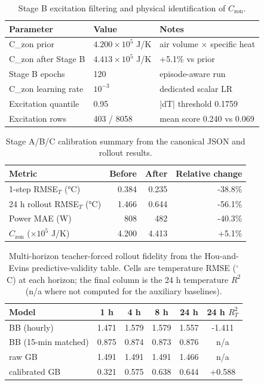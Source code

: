 \documentclass[11pt,a4paper]{article}
\newcommand{\Czon}{\ensuremath{C_{\mathrm{zon}}}}
\begin{document}
\begin{table}[H]
\centering
\small
\caption{Stage B excitation filtering and physical identification of \(\Czon\).}
\label{tab:stage-b}
\begin{tabularx}{\linewidth}{llX}
\toprule
Parameter & Value & Notes \\
\midrule
C\_zon prior & $4.200\times10^5$ J/K & air volume $\times$ specific heat \\
C\_zon after Stage B & $4.413\times10^5$ J/K & +5.1\% vs prior \\
Stage B epochs & 120 & episode-aware run \\
C\_zon learning rate & $10^{-3}$ & dedicated scalar LR \\
Excitation quantile & 0.95 & |dT| threshold 0.1759 \\
Excitation rows & 403 / 8058 & mean score 0.240 vs 0.069 \\
\bottomrule
\end{tabularx}
\end{table}
\begin{table}[H]
\centering
\small
\caption{Stage A/B/C calibration summary from the canonical JSON and rollout results.}
\label{tab:stage-abc}
\begin{tabular}{lrrr}
\toprule
Metric & Before & After & Relative change \\
\midrule
1-step RMSE$_T$ (\si{\celsius}) & 0.384 & 0.235 & -38.8\% \\
24 h rollout RMSE$_T$ (\si{\celsius}) & 1.466 & 0.644 & -56.1\% \\
Power MAE (\si{\watt}) & 808 & 482 & -40.3\% \\
$\Czon$ ($\times 10^5$ J/K) & 4.200 & 4.413 & +5.1\% \\
\bottomrule
\end{tabular}
\end{table}
\begin{table}[H]
\centering
\small
\caption{Multi-horizon teacher-forced rollout fidelity from the Hou-and-Evins predictive-validity table. Cells are temperature RMSE (\(^\circ\)C) at each horizon; the final column is the 24 h temperature \(R^2\) (n/a where not computed for the auxiliary baselines).}
\label{tab:multi-horizon}
\begin{tabular}{lccccc}
\toprule
Model & 1 h & 4 h & 8 h & 24 h & 24 h \(R^2_T\) \\
\midrule
BB (hourly) & 1.471 & 1.579 & 1.579 & 1.557 & -1.411 \\
BB (15-min matched) & 0.875 & 0.874 & 0.873 & 0.876 & n/a \\
raw GB & 1.491 & 1.491 & 1.491 & 1.466 & n/a \\
calibrated GB & 0.321 & 0.575 & 0.638 & 0.644 & +0.588 \\
\bottomrule
\end{tabular}
\end{table}
\end{document}
